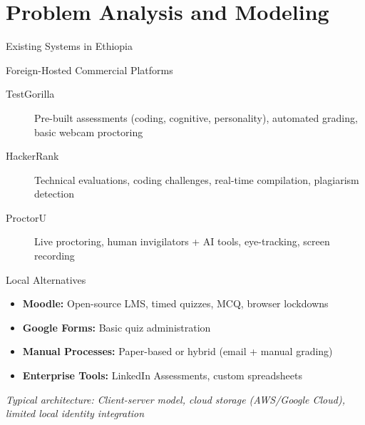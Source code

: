 \section{Problem Analysis and Modeling}

\begin{frame}{Existing Systems in Ethiopia}
    \begin{block}{Foreign-Hosted Commercial Platforms}
        \begin{description}
            \item[TestGorilla] Pre-built assessments (coding, cognitive, personality), automated grading, basic webcam proctoring
            \item[HackerRank] Technical evaluations, coding challenges, real-time compilation, plagiarism detection
            \item[ProctorU] Live proctoring, human invigilators + AI tools, eye-tracking, screen recording
        \end{description}
    \end{block}
    
    \begin{block}{Local Alternatives}
        \begin{itemize}
            \item \textbf{Moodle:} Open-source LMS, timed quizzes, MCQ, browser lockdowns
            \item \textbf{Google Forms:} Basic quiz administration
            \item \textbf{Manual Processes:} Paper-based or hybrid (email + manual grading)
            \item \textbf{Enterprise Tools:} LinkedIn Assessments, custom spreadsheets
        \end{itemize}
    \end{block}
    
    \textit{Typical architecture: Client-server model, cloud storage (AWS/Google Cloud), limited local identity integration}
\end{frame}

